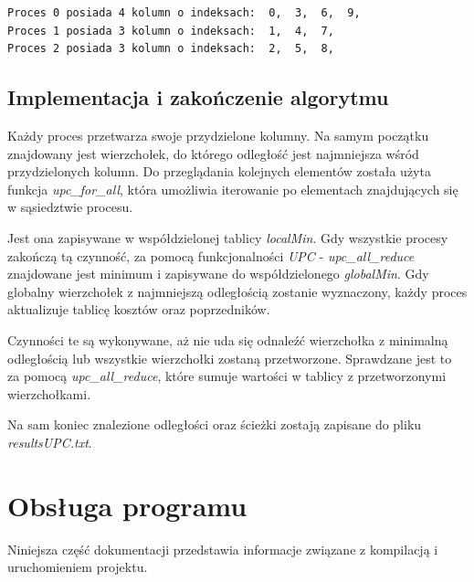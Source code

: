 \documentclass[12pt]{article}
\begin{document}
\begin{lstlisting}
Proces 0 posiada 4 kolumn o indeksach:  0,  3,  6,  9,
Proces 1 posiada 3 kolumn o indeksach:  1,  4,  7,
Proces 2 posiada 3 kolumn o indeksach:  2,  5,  8,
\end{lstlisting}

\subsection{Implementacja i zakończenie algorytmu}
Każdy proces przetwarza swoje przydzielone kolumny. Na samym początku znajdowany jest wierzchołek, do którego odległość jest najmniejsza wśród przydzielonych kolumn. Do przeglądania kolejnych elementów została użyta funkcja \textit{upc\_for\_all}, która umożliwia iterowanie po elementach znajdujących się w sąsiedztwie procesu.

 Jest ona zapisywane w współdzielonej tablicy \textit{localMin}. Gdy wszystkie procesy zakończą tą czynność, za pomocą funkcjonalności \textit{UPC} - \textit{upc\_all\_reduce} znajdowane jest minimum i zapisywane do współdzielonego \textit{globalMin}. Gdy globalny wierzchołek z najmniejszą odległością zostanie wyznaczony, każdy proces aktualizuje tablicę kosztów oraz poprzedników.

Czynności te są wykonywane, aż nie uda się odnaleźć wierzchołka z minimalną odległością lub wszystkie wierzchołki zostaną przetworzone. Sprawdzane jest to za pomocą \textit{upc\_all\_reduce}, które sumuje wartości w tablicy z przetworzonymi wierzchołkami.

Na sam koniec znalezione odległości oraz ścieżki zostają zapisane do pliku \textit{resultsUPC.txt}.

\clearpage
\section{Obsługa programu}
Niniejsza część dokumentacji przedstawia informacje związane z kompilacją i uruchomieniem projektu.
\end{document}
